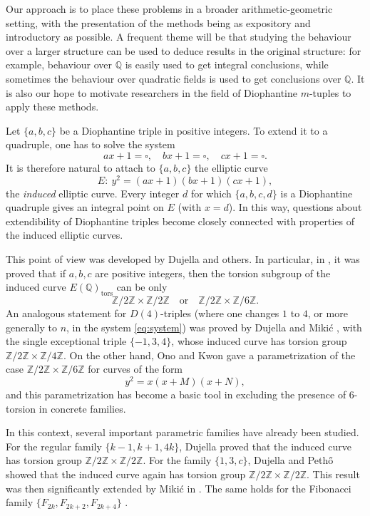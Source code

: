 \documentclass{article}
\theoremstyle{plain}
\newcommand{\Z}{\mathbb{Z}}
\newcommand{\Q}{\mathbb{Q}}
\newcommand{\tors}{\mathrm{tors}}
\begin{document}
Our approach is to place these problems in a broader arithmetic-geometric setting, with the presentation of the methods being as expository and introductory as possible. A frequent theme will be that studying the behaviour over a larger structure can be used to deduce results in the original structure: for example, behaviour over \(\Q\) is easily used to get integral conclusions, while sometimes the behaviour over quadratic fields is used to get conclusions over \(\Q\). It is also our hope to motivate researchers in the field of Diophantine \(m\)-tuples to apply these methods.

Let \(\{a,b,c\}\) be a Diophantine triple in positive integers. 
To extend it to a quadruple, one has to solve the system
\begin{equation}\label{eq:system}
ax+1=\square,\quad bx+1=\square,\quad cx+1=\square.
\end{equation}
It is therefore natural to attach to \(\{a,b,c\}\) the elliptic curve
\[
E:\ y^2=(ax+1)(bx+1)(cx+1),
\]
the \emph{induced} elliptic curve.
Every integer \(d\) for which \(\{a,b,c,d\}\) is a Diophantine quadruple gives an integral point on \(E\) (with \(x=d\)).
In this way, questions about extendibility of Diophantine triples become closely connected with  properties of the induced elliptic curves.

This point of view was developed by Dujella and others. 
In particular, in  \cite{DujeJTNB,DujeiMiljen}, it was proved that if \(a,b,c\) are positive integers, then the torsion subgroup of the induced curve \(E(\Q)_\tors\) can be only
\[
\Z/2\Z\times\Z/2\Z
\quad\text{or}\quad
\Z/2\Z\times\Z/6\Z.
\]
An analogous statement for \(D(4)\)-triples (where one changes \(1\) to \(4\), or more generally to \(n\), in the system \eqref{eq:system}) was proved by Dujella and Miki\'c \cite{DujeiMiljen}, with the single exceptional triple \(\{-1,3,4\}\), whose induced curve has torsion group \(\Z/2\Z\times\Z/4\Z\). 
On the other hand, Ono and Kwon \cite{Ono,Kwon1997} gave a parametrization of the case
\(\Z/2\Z\times\Z/6\Z\) for curves of the form
\[
y^2=x(x+M)(x+N),
\]
and this parametrization has become a basic tool in excluding the presence of \(6\)-torsion in concrete families.

In this context, several important parametric families have already been studied. For the regular family \(\{k-1,k+1,4k\}\), Dujella \cite{DujeParametric} proved that the induced curve has torsion group \(\Z/2\Z\times\Z/2\Z\). 
For the family \(\{1,3,c\}\), Dujella and Pethő \cite{DujePetho} showed that the induced curve again has torsion group \(\Z/2\Z\times\Z/2\Z \). This result was then significantly extended by Mikić in \cite{MikicRMJ2015}. The same holds for the Fibonacci family \(\{F_{2k},F_{2k+2},F_{2k+4}\}\) \cite{DujeJTNB}.
\end{document}
